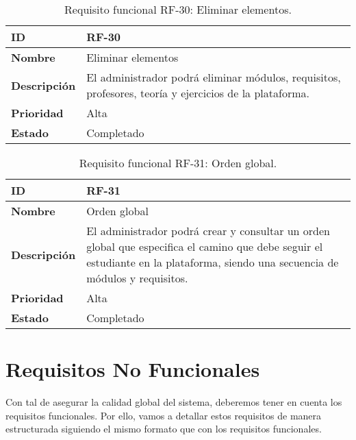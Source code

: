 \begin{table}[H]
    \centering
    \begin{tabular}{|l|p{9.5cm}|}
        \hline
        \textbf{ID} & RF-30 \\
        \hline
        \textbf{Nombre} & Eliminar elementos \\
        \hline
        \textbf{Descripción} & El administrador podrá eliminar módulos, requisitos, profesores, teoría y ejercicios de la plataforma. \\
        \hline
        \textbf{Prioridad} & Alta \\
        \hline
        \textbf{Estado} & Completado \\
        \hline
    \end{tabular}
    \caption{Requisito funcional RF-30: Eliminar elementos.}
    \label{table:req-RF00R}
\end{table}

\begin{table}[H]
    \centering
    \begin{tabular}{|l|p{9.5cm}|}
        \hline
        \textbf{ID} & RF-31 \\
        \hline
        \textbf{Nombre} & Orden global \\
        \hline
        \textbf{Descripción} & El administrador podrá crear y consultar un orden global que especifica el camino que debe seguir el estudiante en la plataforma, siendo una secuencia de módulos y requisitos. \\
        \hline
        \textbf{Prioridad} & Alta \\
        \hline
        \textbf{Estado} & Completado \\
        \hline
    \end{tabular}
    \caption{Requisito funcional RF-31: Orden global.}
    \label{table:req-RF00S}
\end{table}


\section{Requisitos No Funcionales}

Con tal de asegurar la calidad global del sistema, deberemos tener en cuenta los requisitos funcionales. Por ello, vamos a detallar estos requisitos de manera estructurada siguiendo el mismo formato que con los requisitos funcionales.

